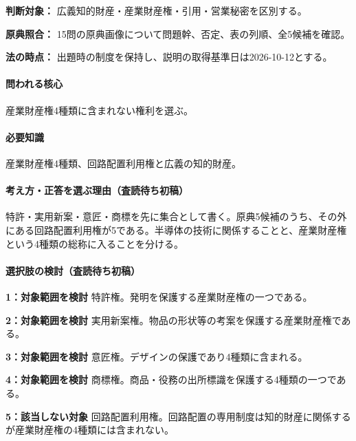 \noindent\textbf{判断対象：} 広義知的財産・産業財産権・引用・営業秘密を区別する。\par

\noindent\textbf{原典照合：} 15問の原典画像について問題幹、否定、表の列順、全5候補を確認。\par

\noindent\textbf{法の時点：} 出題時の制度を保持し、説明の取得基準日は2026-10-12とする。\par

\paragraph{問われる核心} 産業財産権4種類に含まれない権利を選ぶ。

\paragraph{必要知識} 産業財産権4種類、回路配置利用権と広義の知的財産。

\paragraph{考え方・正答を選ぶ理由（査読待ち初稿）} 特許・実用新案・意匠・商標を先に集合として書く。原典5候補のうち、その外にある回路配置利用権が5である。半導体の技術に関係することと、産業財産権という4種類の総称に入ることを分ける。

\paragraph{選択肢の検討（査読待ち初稿）}\mbox{}\par

\noindent\textbf{1：対象範囲を検討} 特許権。発明を保護する産業財産権の一つである。\par

\noindent\textbf{2：対象範囲を検討} 実用新案権。物品の形状等の考案を保護する産業財産権である。\par

\noindent\textbf{3：対象範囲を検討} 意匠権。デザインの保護であり4種類に含まれる。\par

\noindent\textbf{4：対象範囲を検討} 商標権。商品・役務の出所標識を保護する4種類の一つである。\par

\noindent\textbf{5：該当しない対象} 回路配置利用権。回路配置の専用制度は知的財産に関係するが産業財産権の4種類には含まれない。\par

